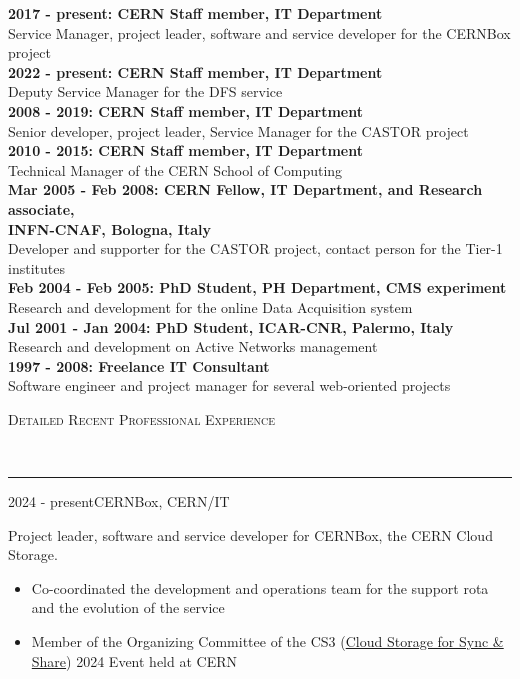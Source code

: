 \documentclass[11pt]{article}
\renewcommand{\section}[2]%
        {\vspace{1.3\baselineskip}%
         \hspace{0in}%
         {\raggedright \scshape #1}\\[-0.15\baselineskip]%
                 \rule{\columnwidth}{1pt}%
        \vspace{.5\baselineskip}%
         \hspace{0in}
}
\renewcommand{\subsection}[2]%
        {
         {\bf{\raggedright \scshape #1}}{\bf{\hfill \scshape #2}}\\[-.7\baselineskip]
}
\newenvironment{CompactItemize} {
  \begin{itemize}
  \setlength{\itemsep}{-3pt}
  \setlength{\parsep}{0pt}
  \setlength{\topsep}{-2pt}
  \setlength{\partopsep}{-2pt}
} {\end{itemize}}
\begin{document}
\textbf{2017 - present: CERN Staff member, IT Department}\\
Service Manager, project leader, software and service developer for the CERNBox project\\[.3\baselineskip]
\textbf{2022 - present: CERN Staff member, IT Department}\\
Deputy Service Manager for the DFS service\\[.3\baselineskip]
\textbf{2008 - 2019: CERN Staff member, IT Department}\\
Senior developer, project leader, Service Manager for the CASTOR project\\[.3\baselineskip]
\textbf{2010 - 2015: CERN Staff member, IT Department}\\
Technical Manager of the CERN School of Computing\\[.3\baselineskip]
\textbf{Mar 2005 - Feb 2008: CERN Fellow, IT Department, and Research associate,\\ INFN-CNAF, Bologna, Italy}\\
Developer and supporter for the CASTOR project, contact person for the Tier-1 institutes\\[.3\baselineskip]
\textbf{Feb 2004 - Feb 2005: PhD Student, PH Department, CMS experiment}\\
Research and development for the online Data Acquisition system\\[.3\baselineskip]
\textbf{Jul 2001 - Jan 2004: PhD Student, ICAR-CNR, Palermo, Italy}\\
Research and development on Active Networks management\\[.3\baselineskip]
\textbf{1997 - 2008: Freelance IT Consultant}\\
Software engineer and project manager for several web-oriented projects


\section{Detailed Recent Professional Experience}

\subsection{2024 - present}{CERNBox, CERN/IT}

Project leader, software and service developer for CERNBox, the CERN Cloud Storage.

\begin{CompactItemize}
\item Co-coordinated the development and operations team for the support rota and the evolution of the service
\item Member of the Organizing Committee of the CS3 (\href{https://www.cs3community.org/}{Cloud Storage for Sync \& Share}) 2024 Event held at CERN
\end{CompactItemize}
\end{document}
